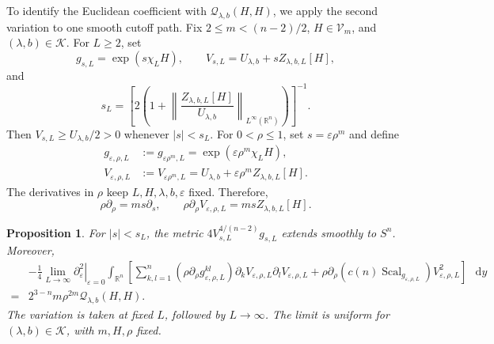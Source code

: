 \documentclass[11pt]{article}
\numberwithin{equation}{section}
\newtheorem{proposition}[theorem]{Proposition}
\theoremstyle{remark}
\newcommand{\R}{\mathbb R}
\newcommand{\Sph}{S}
\newcommand{\eps}{\varepsilon}
\newcommand{\dd}{\mathop{}\!\mathrm{d}}
\begin{document}
{To identify the Euclidean coefficient with
\(\mathcal Q_{\lambda,b}(H,H)\), we apply the second variation to one
smooth cutoff path. Fix \(2\le m<(n-2)/2\), \(H\in\mathcal V_m\), and
\((\lambda,b)\in\mathcal K\). For \(L\ge2\), set}
{
\[
 g_{s,L}=\exp(s\chi_LH),\qquad
 V_{s,L}=U_{\lambda,b}+sZ_{\lambda,b,L}[H],
\]
and
\[
 s_L=\left[2\left(1+
 \left\|\frac{Z_{\lambda,b,L}[H]}{U_{\lambda,b}}\right\|_{L^\infty(\R^n)}
 \right)\right]^{-1}.
\]
Then \(V_{s,L}\ge U_{\lambda,b}/2>0\) whenever \(|s|<s_L\).
For \(0<\rho\le1\), set \(s=\eps\rho^m\) and define
\begin{equation}\label{eq:whole-space-scaling-family}
 \begin{aligned}
 g_{\eps,\rho,L}&:=g_{\eps\rho^m,L}
 =\exp(\eps\rho^m\chi_LH),\\
 V_{\eps,\rho,L}&:=V_{\eps\rho^m,L}
 =U_{\lambda,b}+\eps\rho^mZ_{\lambda,b,L}[H].
 \end{aligned}
\end{equation}
The derivatives in \(\rho\) keep \(L,H,\lambda,b,\eps\) fixed. Therefore,
\[
 \rho\partial_\rho=ms\partial_s,
 \qquad
 \rho\partial_\rho V_{\eps,\rho,L}=msZ_{\lambda,b,L}[H].
\]
}

\begin{proposition}\label{prop:whole-space-coefficient}
For \(|s|<s_L\), the metric \(4V_{s,L}^{4/(n-2)}g_{s,L}\) extends
smoothly to \(\Sph^n\). Moreover,
\begin{equation}\label{eq:whole-space-coefficient}
 \begin{aligned}
 &-\frac14\lim_{L\to\infty}
 \left.\partial_\eps^2\right|_{\eps=0}
 \int_{\R^n}
 \left[
 \sum_{k,l=1}^n(\rho\partial_\rho g_{\eps,\rho,L}^{kl})
 \partial_kV_{\eps,\rho,L}\partial_lV_{\eps,\rho,L}
 +\rho\partial_\rho(c(n)\operatorname{Scal}_{g_{\eps,\rho,L}})
 V_{\eps,\rho,L}^2
 \right]\,\dd y\\
 {}={}&2^{3-n}m\rho^{2m}\mathcal Q_{\lambda,b}(H,H).
 \end{aligned}
\end{equation}
The variation is taken at fixed \(L\), followed by \(L\to\infty\).
The limit is uniform for \((\lambda,b)\in\mathcal K\), with \(m,H,\rho\)
fixed.
\end{proposition}
\end{document}
